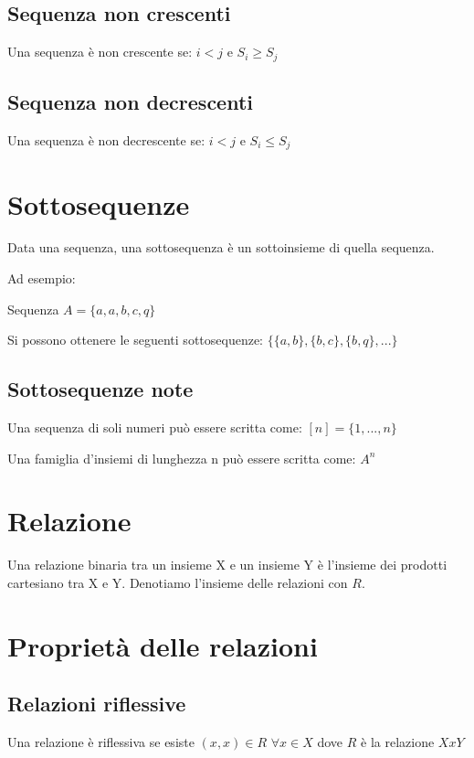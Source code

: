 \documentclass[a4paper]{article}
\begin{document}
\subsection{Sequenza non crescenti}

Una sequenza è non crescente se: $i < j$ e $S_i \geq S_j$

\subsection{Sequenza non decrescenti}

Una sequenza è non decrescente se: $i < j$ e $S_i \leq S_j$

\section{Sottosequenze}

Data una sequenza, una sottosequenza è un sottoinsieme di quella sequenza.

Ad esempio:

Sequenza $A=\{a,a,b,c,q\}$

Si possono ottenere le seguenti sottosequenze: $\{\{a,b\}, \{b,c\}, \{b,q\}, ...\}$

\subsection{Sottosequenze note}

Una sequenza di soli numeri può essere scritta come: $[n] = \{1, ..., n\}$

Una famiglia d'insiemi di lunghezza n può essere scritta come: $A^n$


\section{Relazione}
Una relazione binaria tra un insieme X e un insieme Y è l'insieme dei prodotti cartesiano tra X e Y. Denotiamo l'insieme delle relazioni con $R$.


\section{Proprietà delle relazioni}

\subsection{Relazioni riflessive}

Una relazione è riflessiva se esiste $(x,x) \in R$ $\forall x \in X$ dove $R$ è la relazione $XxY$
\end{document}
